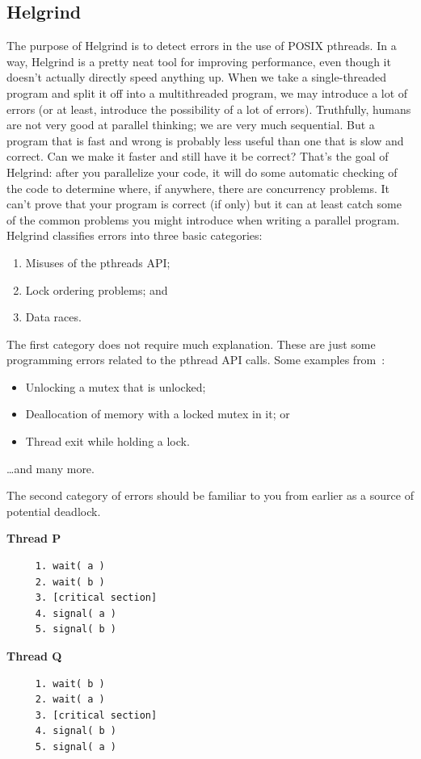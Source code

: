 \documentclass[a4paper]{report}
\begin{document}
\subsection*{Helgrind}
The purpose of Helgrind is to detect errors in the use of POSIX pthreads. In a way, Helgrind is a pretty neat tool for improving performance, even though it doesn't actually directly speed anything up. When we take a single-threaded program and split it off into a multithreaded program, we may introduce a lot of errors (or at least, introduce the possibility of a lot of errors). Truthfully, humans are not very good at parallel thinking; we are very much sequential. But a program that is fast and wrong is probably less useful than one that is slow and correct. Can we make it faster and still have it be correct? That's the goal of Helgrind: after you parallelize your code, it will do some automatic checking of the code to determine where, if anywhere, there are concurrency problems. It can't prove that your program is correct (if only) but it can at least catch some of the common problems you might introduce when writing a parallel program. Helgrind classifies errors into three basic categories:

\begin{enumerate}[noitemsep]
	\item Misuses of the pthreads API;
	\item Lock ordering problems; and
	\item Data races.
\end{enumerate}

The first category does not require much explanation. These are just some programming errors related to the pthread API calls. Some examples from~\cite{helgrind}:

\begin{itemize}[noitemsep]
	\item Unlocking a mutex that is unlocked;
	\item Deallocation of memory with a locked mutex in it; or
	\item Thread exit while holding a lock.
\end{itemize}
\ldots and many more.


The second category of errors should be familiar to you from earlier as a source of potential deadlock.

\begin{multicols}{2}
	\textbf{Thread P}\vspace{-2em}
	\begin{verbatim}
	 1. wait( a ) 
	 2. wait( b )
	 3. [critical section]
	 4. signal( a )
	 5. signal( b )
  \end{verbatim}
	\columnbreak
	\textbf{Thread Q}\vspace{-2em}
	\begin{verbatim}
	 1. wait( b ) 
	 2. wait( a )
	 3. [critical section]
	 4. signal( b )
	 5. signal( a )
  \end{verbatim}
\end{multicols}
\vspace{-2em}
\end{document}
